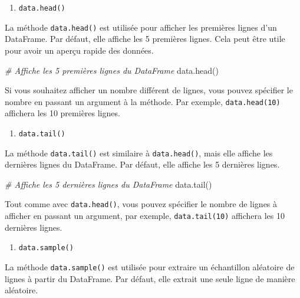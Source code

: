 \documentclass[11pt]{article}
\providecommand{\tightlist}{%
      \setlength{\itemsep}{0pt}\setlength{\parskip}{0pt}}
\newenvironment{Shaded}{}{}
\newcommand{\CommentTok}[1]{\textcolor[rgb]{0.38,0.63,0.69}{\textit{{#1}}}}
\newcommand{\NormalTok}[1]{{#1}}
\begin{document}
\begin{enumerate}
\def\labelenumi{\arabic{enumi}.}
\tightlist
\item
  \texttt{data.head()}
\end{enumerate}

La méthode \texttt{data.head()} est utilisée pour afficher les premières
lignes d'un DataFrame. Par défaut, elle affiche les 5 premières lignes.
Cela peut être utile pour avoir un aperçu rapide des données.

\begin{Shaded}
\begin{Highlighting}[]
\CommentTok{\# Affiche les 5 premières lignes du DataFrame}
\NormalTok{data.head()}
\end{Highlighting}
\end{Shaded}

Si vous souhaitez afficher un nombre différent de lignes, vous pouvez
spécifier le nombre en passant un argument à la méthode. Par exemple,
\texttt{data.head(10)} affichera les 10 premières lignes.

\begin{enumerate}
\def\labelenumi{\arabic{enumi}.}
\setcounter{enumi}{1}
\tightlist
\item
  \texttt{data.tail()}
\end{enumerate}

La méthode \texttt{data.tail()} est similaire à \texttt{data.head()},
mais elle affiche les dernières lignes du DataFrame. Par défaut, elle
affiche les 5 dernières lignes.

\begin{Shaded}
\begin{Highlighting}[]
\CommentTok{\# Affiche les 5 dernières lignes du DataFrame}
\NormalTok{data.tail()}
\end{Highlighting}
\end{Shaded}

Tout comme avec \texttt{data.head()}, vous pouvez spécifier le nombre de
lignes à afficher en passant un argument, par exemple,
\texttt{data.tail(10)} affichera les 10 dernières lignes.

\begin{enumerate}
\def\labelenumi{\arabic{enumi}.}
\setcounter{enumi}{2}
\tightlist
\item
  \texttt{data.sample()}
\end{enumerate}

La méthode \texttt{data.sample()} est utilisée pour extraire un
échantillon aléatoire de lignes à partir du DataFrame. Par défaut, elle
extrait une seule ligne de manière aléatoire.
\end{document}
